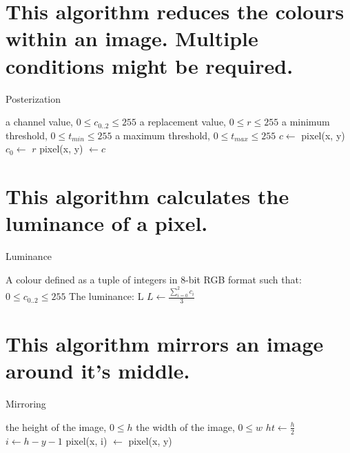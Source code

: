 \documentclass{../../../fal_assignment}
\begin{document}
	\clearpage
	\section{This algorithm reduces the colours within an image. Multiple conditions might be required.}
\begin{algorithm}[ht]
\caption{Posterization}
\label{alg:algorithm}

\begin{algorithmic}[1]
	\Require
	\Statex a channel value,  $0 \leq c_{0..2} \leq 255$
	\Statex a replacement value,  $0 \leq r \leq 255$
	\Statex a minimum threshold,  $0 \leq t_{min} \leq 255$
	\Statex a maximum threshold,  $0 \leq t_{max} \leq 255$
	\State $c \leftarrow$ pixel(x, y)
	\State $c_0 \leftarrow $ $r$
	\State pixel(x, y) $\leftarrow c$
	\EndIf
	\EndFor
	\EndProcedure
\end{algorithmic}

\end{algorithm}

	\clearpage
	\section{This algorithm calculates the luminance of a pixel.}
\begin{algorithm}[ht]
	\caption{Luminance}
	\label{alg:algorithm}
	
	\begin{algorithmic}[1]
		\Require 
		\Statex A colour defined as a tuple of integers in 8-bit RGB format such that:
		\Statex $0 \leq c_{0..2} \leq 255$
		\Ensure
		\Statex The luminance:
		\Statex L
		\Statex
		\Statex $ L \leftarrow \frac{\sum_{i=0}^{2}c_i}{3}$
	\end{algorithmic}
	
\end{algorithm}

	\clearpage
	\section{This algorithm mirrors an image around it's middle.}
\begin{algorithm}[ht]
	\caption{Mirroring}
	\label{alg:algorithm}
	
	\begin{algorithmic}[1]
		\Require
		\Statex the height of the image, $0 \leq h$
		\Statex the width of the image, $0 \leq w$
		\State $ht \leftarrow \frac{h}{2}$
		\State $i \leftarrow h -  y - 1$
		\State pixel(x, i) $\leftarrow$ pixel(x, y)
		\EndFor
	\end{algorithmic}
\end{algorithm}
\end{document}
